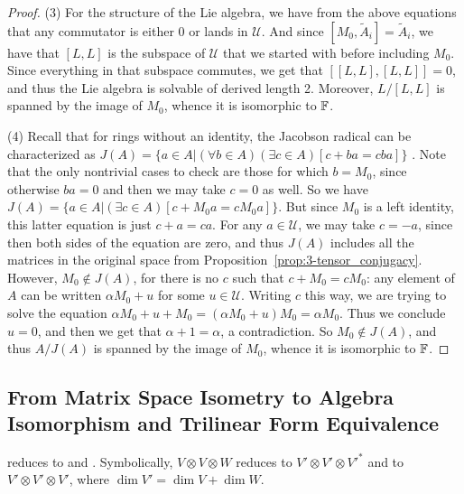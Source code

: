 \documentclass[11pt]{article}
\begin{document}
\begin{proof}
(3) For the structure of the Lie algebra, we have from the above equations that any commutator is either 0 or lands in $\mathcal{U}$. And since $[M_0, \tilde A_i] = \tilde A_i$, we have that $[L,L]$ is the subspace of $\mathcal{U}$ that we started with before including $M_0$. Since everything in that subspace commutes, we get that $[[L,L], [L,L]] = 0$, and thus the Lie algebra is solvable of derived length 2. Moreover, $L / [L, L]$ is spanned by the image of $M_0$, whence it is isomorphic to $\mathbb{F}$.

(4) Recall that for rings without an identity, the Jacobson radical can be characterized as $J(A) = \{ a \in A | (\forall b \in A)(\exists c \in A)[c + ba = cba]\}$ \cite[p.~63]{lam}. Note that the only nontrivial cases to check are those for which $b = M_0$, since otherwise $ba = 0$ and then we may take $c=0$ as well. So we have $J(A) = \{a \in A | (\exists c \in A)[c + M_0 a = c M_0 a]\}$. But since $M_0$ is a left identity, this latter equation is just $c + a = ca$. For any $a \in \mathcal{U}$, we may take $c = -a$, since then both sides of the equation are zero, and thus $J(A)$ includes all the matrices in the original space from Proposition~\ref{prop:3-tensor_conjugacy}. However, $M_0 \notin J(A)$, for there is no $c$ such that $c + M_0 = c M_0$: any element of $A$ can be written $\alpha M_0 + u$ for some $u \in \mathcal{U}$. Writing $c$ this way, we are trying to solve the equation $\alpha M_0 + u + M_0 = (\alpha M_0 + u)M_0 = \alpha M_0$. Thus we conclude $u=0$, and then we get that $\alpha+1 = \alpha$, a contradiction. So $M_0 \notin J(A)$, and thus $A / J(A)$ is spanned by the image of $M_0$, whence it is isomorphic to $\mathbb{F}$.
\end{proof}

\subsection{From Matrix Space Isometry to Algebra Isomorphism and Trilinear Form Equivalence}

\begin{proposition} \label{prop:isometry_algebra}
\MatSpIsomlong reduces to  and \NcCubicFormlong. Symbolically, $V \otimes V \otimes W$ reduces to $V' \otimes V' \otimes V'^*$ and to $V' \otimes V' \otimes V'$, where $\dim V' = \dim V + \dim W$.
\end{proposition}
\end{document}
